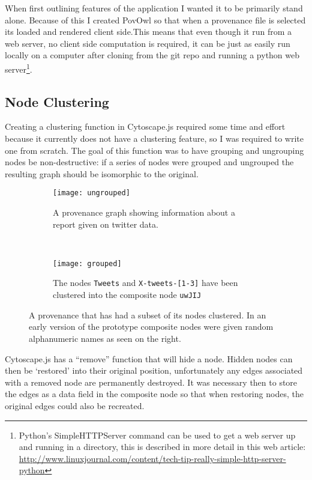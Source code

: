 When first outlining features of the application I wanted it to be primarily stand alone. Because of this I created PovOwl so that when a provenance file is selected its loaded and rendered client side.This means that even though it run from a web server, no client side computation is required, it can be just as easily run locally on a computer after cloning from the git repo and running a python web server\footnote{Python's SimpleHTTPServer command can be used to get a web server up and running in a directory, this is described in more detail in this web article: \url{http://www.linuxjournal.com/content/tech-tip-really-simple-http-server-python}}.

\subsection{Node Clustering}

Creating a clustering function in Cytoscape.js required some time and effort because it currently does not have a clustering feature, so I was required to write one from scratch. The goal of this function was to have grouping and ungrouping nodes be non-destructive: if a series of nodes were grouped and ungrouped the resulting graph should be isomorphic to the original.

\begin{figure}[h]
  \centering
  \begin{subfigure}[t]{0.5\textwidth}
    \texttt{[image: ungrouped]}
    \caption{A provenance graph showing information about a report given on twitter data.}
  \end{subfigure}
  ~
  \begin{subfigure}[t]{0.5\textwidth}
    \texttt{[image: grouped]}
	\caption{The nodes \texttt{Tweets} and \texttt{X-tweets-[1-3]} have been clustered into the composite node \texttt{uwJIJ}}
  \end{subfigure}
  \caption{A provenance that has had a subset of its nodes clustered. In an early version of the prototype composite nodes were given random alphanumeric names as seen on the right.}
\end{figure}

Cytoscape.js has a ``remove'' function that will hide a node. Hidden nodes can then be `restored' into their original position, unfortunately any edges associated with a removed node are permanently destroyed. It was necessary then to store the edges as a data field in the composite node so that when restoring nodes, the original edges could also be recreated. 

